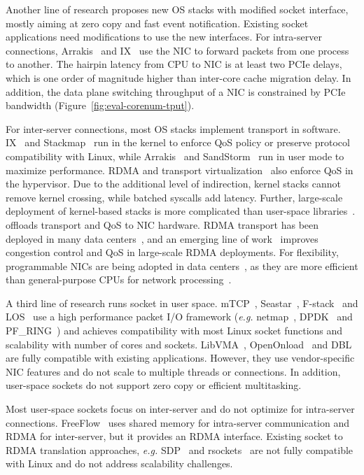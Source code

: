 Another line of research proposes new OS stacks with modified socket interface, mostly aiming at zero copy and fast event notification. Existing socket applications need modifications to use the new interfaces.
For intra-server connections, Arrakis~\cite{peter2016arrakis} and IX~\cite{belay2017ix} use the NIC to forward packets from one process to another. The hairpin latency from CPU to NIC is at least two PCIe delays, which is one order of magnitude higher than inter-core cache migration delay. In addition, the data plane switching throughput of a NIC is constrained by PCIe bandwidth (Figure~\ref{fig:eval-corenum-tput}).

For inter-server connections, most OS stacks implement transport in software. IX~\cite{belay2017ix} and Stackmap~\cite{yasukata2016stackmap} run in the kernel to enforce QoS policy or preserve protocol compatibility with Linux, while Arrakis~\cite{peter2016arrakis} and SandStorm~\cite{marinos2014network} run in user mode to maximize performance.
RDMA and transport virtualization~\cite{tsai2017lite,niu2017network} also enforce QoS in the hypervisor.
Due to the additional level of indirection, kernel stacks cannot remove kernel crossing, while batched syscalls add latency.
Further, large-scale deployment of kernel-based stacks is more complicated than user-space libraries~\cite{andromeda}.
\sys offloads transport and QoS to NIC hardware.
RDMA transport has been deployed in many data centers~\cite{guo2016rdma}, and an emerging line of work~\cite{zhu2015congestion,lu2017memory,mprdma} improves congestion control and QoS in large-scale RDMA deployments.
For flexibility, programmable NICs are being adopted in data centers~\cite{smartnic,cavium}, as they are more efficient than general-purpose CPUs for network processing~\cite{kaufmann2015flexnic,li2016clicknp}.



A third line of research runs socket in user space.
mTCP~\cite{jeong2014mtcp}, Seastar~\cite{seastar}, 
F-stack~\cite{fstack} and LOS~\cite{huang2017high} use a high performance packet I/O framework (\textit{e.g.} netmap~\cite{rizzo2012netmap}, DPDK~\cite{dpdk} and PF\_RING~\cite{pf-ring}) and achieves compatibility with most Linux socket functions and scalability with number of cores and sockets.
LibVMA~\cite{libvma}, OpenOnload~\cite{openonload} and DBL~\cite{dbl} are fully compatible with existing applications. However, they use vendor-specific NIC features and do not scale to multiple threads or connections.
In addition, user-space sockets do not support zero copy or efficient multitasking.

Most user-space sockets focus on inter-server and do not optimize for intra-server connections.
FreeFlow~\cite{freeflow} uses shared memory for intra-server communication and RDMA for inter-server, but it provides an RDMA interface.
Existing socket to RDMA translation approaches, \textit{e.g.} SDP~\cite{socketsdirect} and rsockets~\cite{rsockets} are not fully compatible with Linux and do not address scalability challenges.

